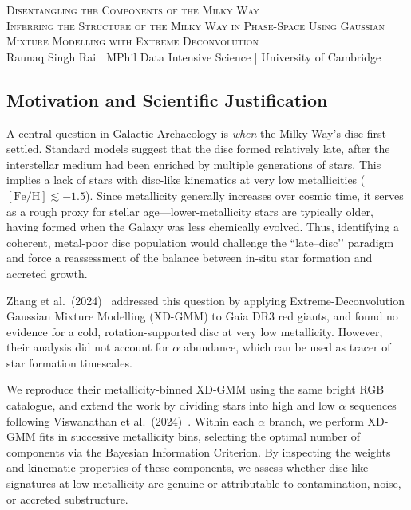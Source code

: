 \documentclass[a4paper,10pt]{article}
\begin{document}
\begin{center}
    {\Large \textsc{Disentangling the Components of the Milky Way}}\\[0.2cm]
    {\textsc{Inferring the Structure of the Milky Way in Phase-Space Using Gaussian Mixture Modelling with Extreme Deconvolution}}\\[0.2cm]
    Raunaq Singh Rai \quad | \quad MPhil Data Intensive Science \quad | \quad University of Cambridge
\end{center}

\begin{multicols}{2}

\section*{Motivation and Scientific Justification}

A central question in Galactic Archaeology is \emph{when} the Milky Way’s disc first settled.  
Standard models suggest that the disc formed relatively late, after the interstellar medium had been enriched by multiple generations of stars. 
This implies a lack of stars with disc-like kinematics at very low metallicities ($[\mathrm{Fe/H}] \lesssim -1.5$). 
Since metallicity generally increases over cosmic time, it serves as a rough proxy for stellar age—lower-metallicity stars are typically older, having formed when the Galaxy was less chemically evolved. 
Thus, identifying a coherent, metal-poor disc population would challenge the “late–disc’’ paradigm and force a reassessment of the balance between in-situ star formation and accreted growth.

Zhang et al.\ (2024)~\cite{zhang2024existencemetalpoordiscmilky} addressed this question by applying Extreme-Deconvolution Gaussian Mixture Modelling (XD-GMM) to Gaia DR3 red giants, and found no evidence for a cold, rotation-supported disc at very low metallicity.  
However, their analysis did not account for $\alpha$ abundance, which can be used as tracer of star formation timescales.

We reproduce their metallicity-binned XD-GMM using the same bright RGB catalogue, and extend the work by dividing stars into high and low $\alpha$ sequences following Viswanathan et al.\ (2024)~\cite{Vis2024}.  
Within each $\alpha$ branch, we perform XD-GMM fits in successive metallicity bins, selecting the optimal number of components via the Bayesian Information Criterion.  
By inspecting the weights and kinematic properties of these components, we assess whether disc-like signatures at low metallicity are genuine or attributable to contamination, noise, or accreted substructure.


\end{multicols}
\end{document}

